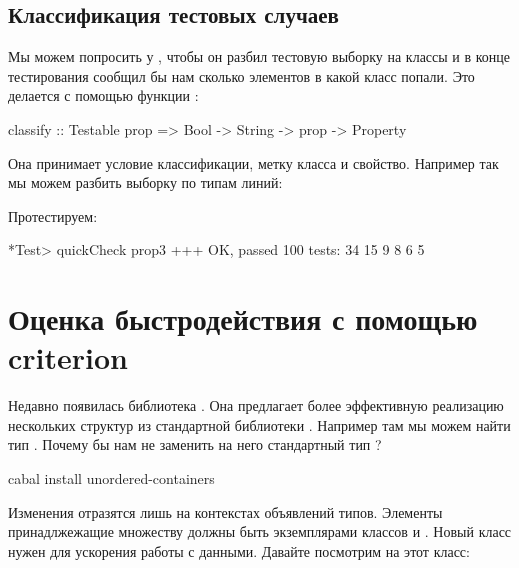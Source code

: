 \subsection{Классификация тестовых случаев}

Мы можем попросить у , чтобы он разбил тестовую выборку
на классы и в конце тестирования сообщил бы нам сколько элементов в
какой класс попали. Это делается с помощью функции :


\begin{code}
classify :: Testable prop => Bool -> String -> prop -> Property
\end{code}

Она принимает условие классификации, метку класса и свойство. Например
так мы можем разбить выборку по типам линий:



Протестируем:


\begin{code}
*Test> quickCheck prop3
+++ OK, passed 100 tests:
34%
15%
 9%
 8%
 6%
 5%
\end{code}

\section{Оценка быстродействия с помощью criterion}

Недавно появилась библиотека . Она предлагает
более эффективную реализацию нескольких структур из стандартной
библиотеки . Например там мы можем найти тип
. Почему бы нам не заменить на него стандартный тип
?


\begin{code}
cabal install unordered-containers
\end{code}

Изменения отразятся лишь на контекстах объявлений типов. Элементы
принадлжежащие множеству  должны быть экземплярами классов
 и . Новый класс  нужен для ускорения
работы с данными. Давайте посмотрим на этот класс:


